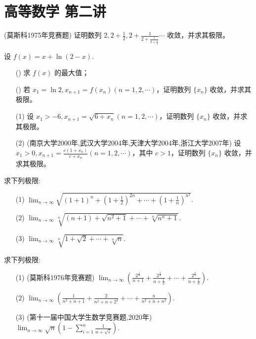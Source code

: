 \documentclass[12pt, a4paper, oneside, UTF8]{ctexbook}
\begin{document}
% 
\else
\fi

\chapter{高等数学 第二讲}
\begin{example}(莫斯科1975年竞赛题)
证明数列 $ 2,2+\frac{1}{2},2+\frac{1}{2+\frac{1}{2+\frac{1}{2}}} \cdots $ 收敛，并求其极限。
\end{example}

\begin{example}
设 $ f(x)=x+\ln(2-x) $.
\begin{enumerate}
    \item[(\uppercase\expandafter{\romannumeral1})] 求 $ f(x) $ 的最大值；
    \item[(\uppercase\expandafter{\romannumeral2})] 若 $ x_{1}=\ln 2,x_{n+1}=f(x_{n})(n=1,2,\cdots) $，证明数列 $ \{x_{n}\} $ 收敛，并求其极限。
\end{enumerate}
\end{example}

\begin{example}
\begin{enumerate}
    \item[(1)] 设 $ x_{1}>-6,x_{n+1}=\sqrt{6+x_{n}}(n=1,2,\cdots) $，证明数列 $ \{x_{n}\} $ 收敛，并求其极限。
    \item[(2)] (南京大学2000年,武汉大学2004年,天津大学2004年,浙江大学2007年) 设 $ x_{1}>0,x_{n+1}=\frac{c(1+x_{n})}{c+x_{n}}(n=1,2,\cdots) $，其中 $ c>1 $，证明数列 $ \{x_{n}\} $ 收敛，并求其极限。
\end{enumerate}
\end{example}

\begin{example}求下列极限:
\begin{enumerate}
    \item[(1)] $ \lim_{n\to\infty}\sqrt{(1+1)^{n}+\left(1+\frac{1}{2}\right)^{2n}+\cdots+\left(1+\frac{1}{n}\right)^{n^{2}}} $.
    \item[(2)] $ \lim_{n\to\infty}\sqrt[n]{(n+1)+\sqrt{n^{2}+1}+\cdots+\sqrt[n]{n^{n}+1}} $.
    \item[(3)] $ \lim _{n\rightarrow\infty}\sqrt[n]{1+\sqrt{2}+\cdots+\sqrt[n]{n}} $.
\end{enumerate}
\end{example}

\begin{example}求下列极限:
\begin{enumerate}
    \item[(1)] (莫斯科1976年竞赛题) $ \lim_{n\rightarrow\infty}\left(\frac{2^{\frac{1}{n}}}{n+1}+\frac{2^{\frac{2}{n}}}{n+\frac{1}{2}}+\cdots+\frac{2^{\frac{n}{n}}}{n+\frac{1}{n}}\right) $.
    \item[(2)] $ \lim_{n\rightarrow\infty}\left(\frac{1}{n^{2}+n+1}+\frac{2}{n^{2}+n+2^{2}}+\cdots+\frac{n}{n^{2}+n+n^{2}}\right) $.
    \item[(3)] (第十一届中国大学生数学竞赛题,2020年) $ \lim_{n\rightarrow\infty}\sqrt{n}\left(1-\sum_{i=1}^{n}\frac{1}{n+\sqrt{i}}\right) $.
\end{enumerate}
\end{example}
\end{document}
